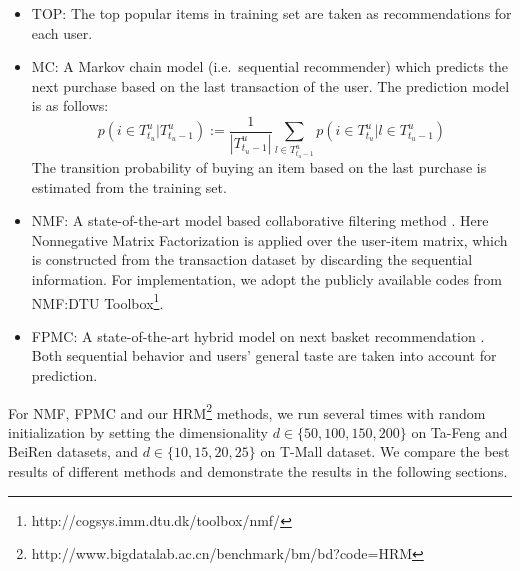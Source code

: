 \documentclass[10pt,journal,compsoc]{IEEEtran}
\begin{document}
\begin{itemize}
    \item TOP: The top popular items in training set are taken as recommendations for each user.
    \item MC: A Markov chain model (i.e.~sequential recommender) which predicts the next purchase based on the last transaction of the user. The prediction model is as follows:
        \begin{displaymath}
        p(i\in T^u_{t_u}|T^u_{t_u-1}):=\frac{1}{|T^u_{t_u-1}|}\sum_{l\in T^u_{t_u-1}}p(i\in T^u_{t_u}|l\in T^u_{t_u-1})
        \end{displaymath}
        The transition probability of buying an item based on the last purchase is estimated from the training set.
    \item NMF: A state-of-the-art model based collaborative filtering method \cite{Lee2001}. Here Nonnegative Matrix Factorization is applied over the user-item matrix, which is constructed from the transaction dataset by discarding the sequential information. For implementation, we adopt the publicly available codes from NMF:DTU Toolbox\footnote{http://cogsys.imm.dtu.dk/toolbox/nmf/}.
    \item FPMC: A state-of-the-art hybrid model on next basket recommendation \cite{fpmc}. Both sequential behavior and users' general taste are taken into account for prediction.
\end{itemize}

For NMF, FPMC and our HRM\footnote{http://www.bigdatalab.ac.cn/benchmark/bm/bd?code=HRM} methods, we run several times with random initialization by setting the dimensionality $d\in\{50, 100, 150, 200\}$ on Ta-Feng and BeiRen datasets, and $d\in\{10, 15, 20, 25\}$ on T-Mall dataset. We compare the best results of different methods and demonstrate the results in the following sections.
\end{document}
